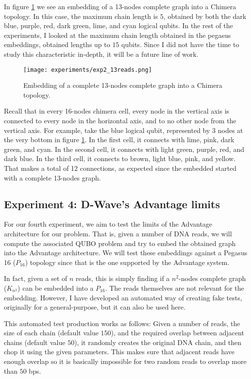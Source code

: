In figure \ref{fig:exp2_13reads} we see an embedding of a 13-nodes complete graph into a Chimera topology. In this case, the maximum chain length is $5$, obtained by both the dark blue, purple, red, dark green, lime, and cyan logical qubits. In the rest of the experiments, I looked at the maximum chain length obtained in the pegasus embeddings, obtained lengths up to $15$ qubits. Since I did not have the time to study this characteristic in-depth, it will be a future line of work.

\begin{figure}[h]
	\texttt{[image: experiments/exp2\_13reads.png]}
	\centering
	\caption{Embedding of a complete 13-nodes complete graph into a Chimera topology.}
	\label{fig:exp2_13reads}
\end{figure}

Recall that in every 16-nodes chimera cell, every node in the vertical axis is connected to every node in the horizontal axis, and to no other node from the vertical axis. For example, take the blue logical qubit, represented by 3 nodes at the very bottom in figure \ref{fig:exp2_13reads}. In the first cell, it connects with lime, pink, dark green, and cyan. In the second cell, it connects with light green, purple, red, and dark blue. In the third cell, it connects to brown, light blue, pink, and yellow. That makes a total of 12 connections, as expected since the embedded started with a complete 13-nodes graph.


\FloatBarrier
\subsection{Experiment 4: D-Wave's Advantage limits}


For our fourth experiment, we aim to test the limits of the Advantage architecture for our problem. That is, given a number of DNA reads, we will compute the associated QUBO problem and try to embed the obtained graph into the Advantage architecture. We will test these embeddings against a Pegasus 16 ($P_{16}$) topology since that is the one supported by the Advantage system.

In fact, given a set of $n$ reads, this is simply finding if a $n^2$-nodes complete graph ($K_{n^2}$) can be embedded into a $P_{16}$. The reads themselves are not relevant for the embedding. However, I have developed an automated way of creating fake tests, originally for a general-purpose, but it can also be used here.

This automated test production works as follows: Given a number of reads, the size of each chain (default value $150$), and the required overlap between adjacent chains (default value $50$), it randomly creates the original DNA chain, and then chop it using the given parameters. This makes sure that adjacent reads have enough overlap so it is basically impossible for two random reads to overlap more than $50$ bps.

